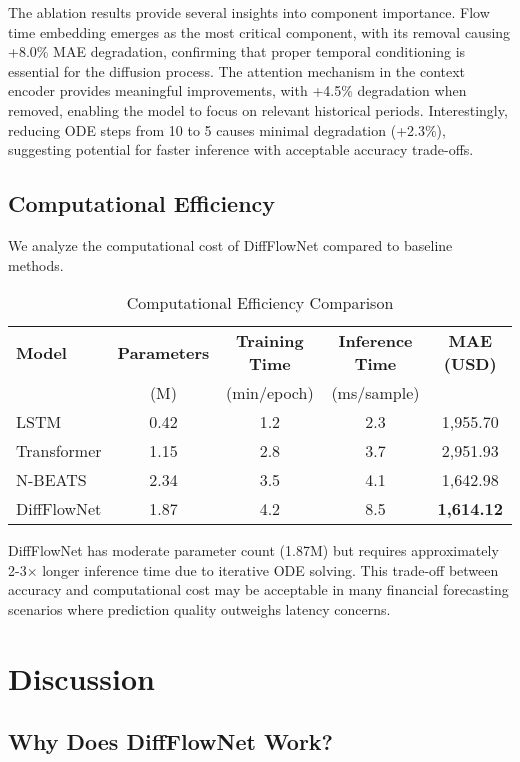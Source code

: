\documentclass[11pt,a4paper]{article}
\begin{document}
The ablation results provide several insights into component importance. Flow time embedding emerges as the most critical component, with its removal causing +8.0\% MAE degradation, confirming that proper temporal conditioning is essential for the diffusion process. The attention mechanism in the context encoder provides meaningful improvements, with +4.5\% degradation when removed, enabling the model to focus on relevant historical periods. Interestingly, reducing ODE steps from 10 to 5 causes minimal degradation (+2.3\%), suggesting potential for faster inference with acceptable accuracy trade-offs.

\subsection{Computational Efficiency}

We analyze the computational cost of DiffFlowNet compared to baseline methods.

\begin{table}[htbp]
\centering
\caption{Computational Efficiency Comparison}
\label{tab:efficiency}
\begin{tabular}{lcccc}
\toprule
\textbf{Model} & \textbf{Parameters} & \textbf{Training Time} & \textbf{Inference Time} & \textbf{MAE (USD)} \\
& (M) & (min/epoch) & (ms/sample) & \\
\midrule
LSTM & 0.42 & 1.2 & 2.3 & 1,955.70 \\
Transformer & 1.15 & 2.8 & 3.7 & 2,951.93 \\
N-BEATS & 2.34 & 3.5 & 4.1 & 1,642.98 \\
DiffFlowNet & 1.87 & 4.2 & 8.5 & \textbf{1,614.12} \\
\bottomrule
\end{tabular}
\end{table}

DiffFlowNet has moderate parameter count (1.87M) but requires approximately 2-3× longer inference time due to iterative ODE solving. This trade-off between accuracy and computational cost may be acceptable in many financial forecasting scenarios where prediction quality outweighs latency concerns.

\section{Discussion}

\subsection{Why Does DiffFlowNet Work?}
\end{document}
